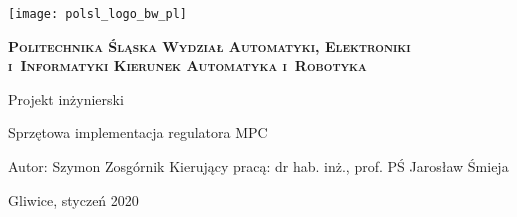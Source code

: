 \newpage
\thispagestyle{empty}
\begin{onehalfspacing}
\begin{center}
	\texttt{[image: polsl\_logo\_bw\_pl]}
	\vspace{0.8cm}
	
	\fontsize{18}{18} \selectfont
	\textbf{\textsc{Politechnika Śląska \linebreak
	Wydział Automatyki, Elektroniki i~Informatyki \linebreak
	Kierunek Automatyka i~Robotyka}}
	\vspace{1.3cm}
	
	\fontsize{16}{16} \selectfont
	Projekt inżynierski
	\vspace{1.7cm}
	
	\fontsize{14}{14} \selectfont
	Sprzętowa implementacja regulatora MPC
	\vspace{5cm}
	
	\begin{flushleft}
	Autor: Szymon Zosgórnik \linebreak
	Kierujący pracą: dr hab. inż., prof. PŚ Jarosław Śmieja \linebreak
	\end{flushleft}
	
	\vfill
	\fontsize{12}{12} \selectfont
	Gliwice, styczeń 2020
\end{center}
\end{onehalfspacing}
\restoregeometry
